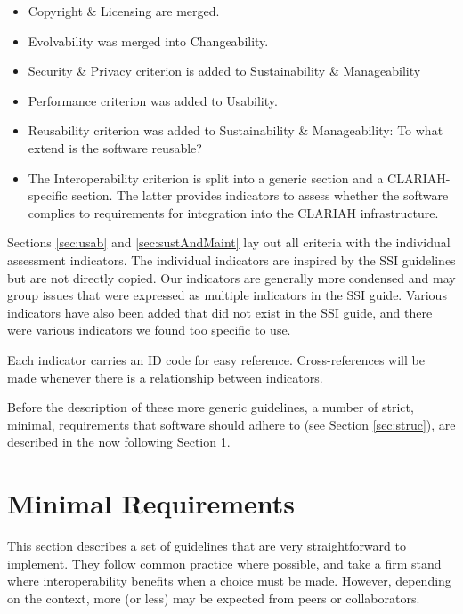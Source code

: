 \documentclass[a4paper,11pt]{article}
\begin{document}
\begin{itemize}
\item Copyright \& Licensing are merged.
\item Evolvability was merged into Changeability.
\item Security \& Privacy criterion is added to Sustainability \& Manageability
\item Performance criterion was added to Usability.
\item Reusability criterion was added to Sustainability \& Manageability: To what extend is the software reusable?
%
%
%
\item The Interoperability criterion is split into a generic section and a CLARIAH-specific section. The latter provides indicators to assess
whether the software complies to requirements for integration into the CLARIAH infrastructure.
\end{itemize}

Sections \ref{sec:usab} and \ref{sec:sustAndMaint} lay out all criteria with the individual assessment
indicators. The individual indicators are inspired by the SSI guidelines but
are not directly copied. Our indicators are generally more condensed and may
group issues that were expressed as multiple indicators in the SSI guide.
Various indicators have also been added that did not exist in the SSI guide,
and there were various indicators we found too specific to use.

Each indicator carries an ID code for easy reference. Cross-references will be
made whenever there is a relationship between indicators.

Before the description of these more generic guidelines, a number of strict, minimal, requirements that software should adhere to (see Section \ref{sec:struc}), are described in the now following Section \ref{sec:req}.

\section{Minimal Requirements}\label{sec:req}

This section describes a set of guidelines that are very straightforward to implement. They follow common practice where possible, and take a firm stand where interoperability benefits when a choice must be made. However, depending on the context, more (or less) may be expected from peers or collaborators.
\end{document}

